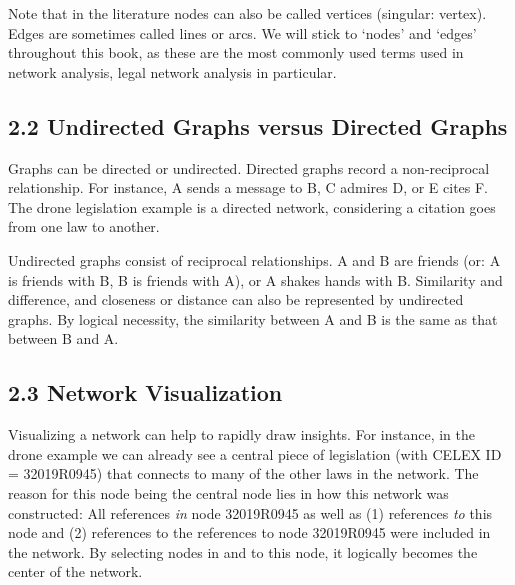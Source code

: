 Note that in the literature nodes can also be called vertices (singular:
vertex). Edges are sometimes called lines or arcs. We will stick to
`nodes' and `edges' throughout this book, as these are the most commonly
used terms used in network analysis, legal network analysis in
particular.

    \hypertarget{undirected-graphs-versus-directed-graphs}{%
\subsection{2.2 Undirected Graphs versus Directed
Graphs}\label{undirected-graphs-versus-directed-graphs}}

Graphs can be directed or undirected. Directed graphs record a
non-reciprocal relationship. For instance, A sends a message to B, C
admires D, or E cites F. The drone legislation example is a directed
network, considering a citation goes from one law to another.

    Undirected graphs consist of reciprocal relationships. A and B are
friends (or: A is friends with B, B is friends with A), or A shakes
hands with B. Similarity and difference, and closeness or distance can
also be represented by undirected graphs. By logical necessity, the
similarity between A and B is the same as that between B and A.

    \hypertarget{network-visualization}{%
\subsection{2.3 Network Visualization}\label{network-visualization}}

Visualizing a network can help to rapidly draw insights. For instance,
in the drone example we can already see a central piece of legislation
(with CELEX ID = 32019R0945) that connects to many of the other laws in
the network. The reason for this node being the central node lies in how
this network was constructed: All references \emph{in} node 32019R0945
as well as (1) references \emph{to} this node and (2) references to the
references to node 32019R0945 were included in the network. By selecting
nodes in and to this node, it logically becomes the center of the
network.

